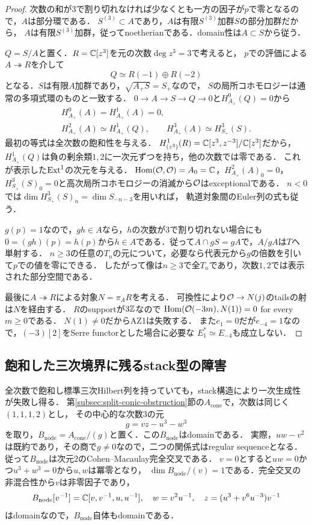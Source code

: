 \documentclass[11pt,a4paper]{ltjsarticle}
\begin{document}
\begin{proof}
次数の和が$3$で割り切れなければ少なくとも一方の因子が$p$で零となるので，$A$は部分環である．
$S^{(3)}\subset A$であり，$A$は有限$S^{(3)}$加群$S$の部分加群だから，
$A$は有限$S^{(3)}$加群，従ってnoetherianである．domain性は$A\subset S$から従う．

$Q=S/A$と置く．$R=\mathbb C[z^3]$を元の次数$\deg z^3=3$で考えると，
$p$での評価による$A\twoheadrightarrow R$を介して
\[
 Q\simeq R(-1)\oplus R(-2)
\]
となる．$S$は有限$A$加群であり，$\sqrt{A_+S}=S_+$なので，
$S$の局所コホモロジーは通常の多項式環のものと一致する．
$0\to A\to S\to Q\to0$と$H^0_{A_+}(Q)=0$から
\[
 \begin{gathered}
 H^0_{A_+}(A)=H^1_{A_+}(A)=0,\\
 H^2_{A_+}(A)\simeq H^1_{A_+}(Q),\qquad
 H^3_{A_+}(A)\simeq H^3_{S_+}(S).
 \end{gathered}
\]
最初の等式は全次数の飽和性を与える．
$H^1_{(z^3)}(R)=\mathbb C[z^3,z^{-3}]/\mathbb C[z^3]$だから，
$H^1_{A_+}(Q)$は負の剰余類$1,2$に一次元ずつを持ち，他の次数では零である．
これが表示した$\operatorname{Ext}^1$の次元を与える．
$\operatorname{Hom}(\mathcal O,\mathcal O)=A_0=\mathbb C$，$H^2_{A_+}(A)_0=0$，
$H^3_{S_+}(S)_0=0$と高次局所コホモロジーの消滅から$\mathcal O$はexceptionalである．
$n<0$では$\dim H^3_{S_+}(S)_n=\dim S_{-n-3}$を用いれば，
軌道対象間のEuler列の式も従う．

$g(p)=1$なので，$gh\in A$なら，$h$の次数が$3$で割り切れない場合にも
$0=(gh)(p)=h(p)$から$h\in A$である．従って$A\cap gS=gA$で，$A/gA$は$T$へ単射する．
$n\geq3$の任意の$T_n$の元について，必要なら代表元から$g$の倍数を引いて$p$での値を零にできる．
したがって像は$n\geq3$で全$T_n$であり，次数$1,2$では表示された部分空間である．

最後に$A\twoheadrightarrow R$による対象$N=\pi_AR$を考える．
可換性により$\mathcal O\to N(j)$のtailsの射は$N$を経由する．
$R$のsupportが$3\mathbb Z$なので
$\operatorname{Hom}(\mathcal O(-3m),N(1))=0$ for every $m\geq0$である．
$N(1)\ne0$だからAZ1は失敗する．
また$e_1=0$だが$e_{-4}=1$なので，$(-3)[2]$をSerre functorとした場合に必要な
$E_1^*\simeq E_{-4}$も成立しない．
\end{proof}

\subsection{飽和した三次境界に残るstack型の障害}\label{subsec:cubic-stack-obstruction}
全次数で飽和し標準三次Hilbert列を持っていても，stack構造により一次生成性が失敗し得る．
第\ref{subsec:split-conic-obstruction}節の$A_{\mathrm{cone}}$で，次数は同じく$(1,1,1,2)$とし，
その中心的な次数3の元
\[
 g=vz-u^3-w^3
\]
を取り，$B_{\mathrm{node}}=A_{\mathrm{cone}}/(g)$と置く．この$B_{\mathrm{node}}$はdomainである．
実際，$uw-v^2$は既約であり，その商で$g\ne0$なので，二つの関係式はregular sequenceとなる．
従って$B_{\mathrm{node}}$は次元$2$のCohen--Macaulay完全交叉である．
$v=0$とすると$uw=0$かつ$u^3+w^3=0$から$u,w$は冪零となり，
$\dim B_{\mathrm{node}}/(v)=1$である．完全交叉の非混合性から$v$は非零因子であり，
\[
 B_{\mathrm{node}}[v^{-1}]
 =\mathbb C[v,v^{-1},u,u^{-1}],\quad
 w=v^2u^{-1},\quad z=(u^3+v^6u^{-3})v^{-1}
\]
はdomainなので，$B_{\mathrm{node}}$自体もdomainである．
\end{document}
